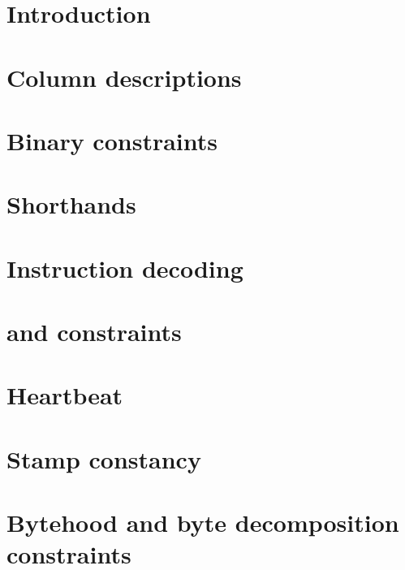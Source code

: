 \section{Introduction}                                                       \label{alu: mod: intro}                 
\section{Column descriptions}                                                \label{alu: mod: col desc}              
\section{Binary constraints}                                                 \label{alu: mod: binary}                
\section{Shorthands}                                                         \label{alu: mod: shorthands}            
\section{Instruction decoding}                                               \label{alu: mod: instruction decoding}  
\section{\oli{} and \mli{} constraints}                                      \label{alu: mod: oli}                   
\section{Heartbeat}                                                          \label{alu: mod: heartbeat}             
\section{Stamp constancy}                                                    \label{alu: mod: stamp constancy}       
\section{Bytehood and byte decomposition constraints}                        \label{alu: mod: byte dec}                
